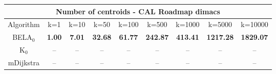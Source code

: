 \begin{tabular}{c|cccccccc}\toprule
\multicolumn{9}{c}{Number of centroids - CAL Roadmap dimacs}\\ \midrule
Algorithm & k=1 & k=10 & k=50 & k=100 & k=500 & k=1000 & k=5000 & k=10000 \\ \midrule
BELA$_0$ & \textbf{1.00} & \textbf{7.01} & \textbf{32.68} & \textbf{61.77} & \textbf{242.87} & \textbf{413.41} & \textbf{1217.28} & \textbf{1829.07} \\
K$_0$ & -- & -- & -- & -- & -- & -- & -- & -- \\
mDijkstra & -- & -- & -- & -- & -- & -- & -- & -- \\ \bottomrule 
\end{tabular}
